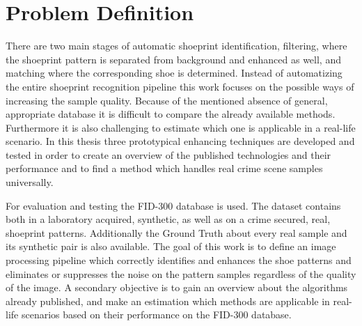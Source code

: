 \documentclass[draft,final]{vutinfth} %
\begin{document}
\section{Problem Definition}
\par
There are two main stages of automatic shoeprint identification, filtering, where the shoeprint pattern is separated from background and enhanced as well, and matching where the corresponding shoe is determined.
Instead of automatizing the entire shoeprint recognition pipeline this work focuses on the possible ways of increasing the sample quality.
Because of the mentioned absence of general, appropriate database it is difficult to compare the already available methods.
Furthermore it is also challenging to estimate which one is applicable in a real-life scenario.
In this thesis three prototypical enhancing techniques are developed and tested in order to create an overview of the published technologies and their performance and to find a method which handles real crime scene samples universally.
\par
For evaluation and testing the FID-300 database is used.
The dataset contains both in a laboratory acquired, synthetic, as well as on a crime secured, real, shoeprint patterns.
Additionally the Ground Truth about every real sample and its synthetic pair is also available.
The goal of this work is to define an image processing pipeline which correctly identifies and enhances the shoe patterns and eliminates or suppresses the noise on the pattern samples regardless of the quality of the image.
A secondary objective is to gain an overview about the algorithms already published, and make an estimation which methods are applicable in real-life scenarios based on their performance on the FID-300 database.
\end{document}
